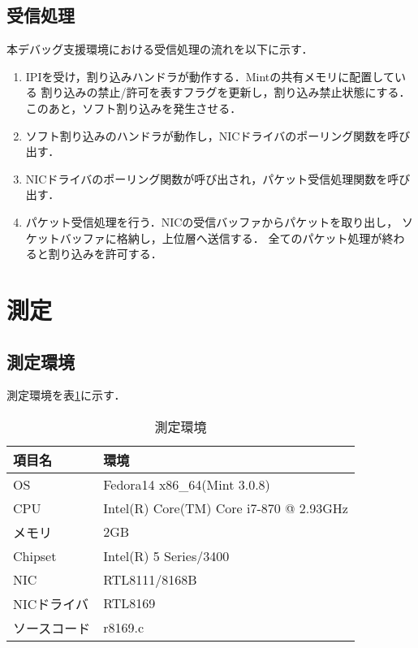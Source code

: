 \documentclass[12pt]{jsarticle}
\begin{document}
\subsection{受信処理}\label{rx}
本デバッグ支援環境における受信処理の流れを以下に示す．
\begin{enumerate}
    \item IPIを受け，割り込みハンドラが動作する．Mintの共有メモリに配置している
        割り込みの禁止/許可を表すフラグを更新し，割り込み禁止状態にする．
        このあと，ソフト割り込みを発生させる．
    \item ソフト割り込みのハンドラが動作し，NICドライバのポーリング関数を呼び出す．
    \item NICドライバのポーリング関数が呼び出され，パケット受信処理関数を呼び出す．
    \item パケット受信処理を行う．NICの受信バッファからパケットを取り出し，
        ソケットバッファに格納し，上位層へ送信する．
        全てのパケット処理が終わると割り込みを許可する．
\end{enumerate}

\section{測定}
\subsection{測定環境}
測定環境を表\ref{environment}に示す．

\begin{table}[h]
    \caption{測定環境}
    \label{environment}
    \begin{center}
        \begin{tabular}{l|l}   \hline \hline 
            項目名      & 環境                                    \\ \hline
            OS          & Fedora14 x86\_64(Mint 3.0.8)            \\ 
            CPU         & Intel(R) Core(TM) Core i7-870 @ 2.93GHz \\
            メモリ      & 2GB                                     \\
            Chipset     & Intel(R) 5 Series/3400                  \\
            NIC         & RTL8111/8168B                           \\
            NICドライバ & RTL8169                                 \\ 
            ソースコード& r8169.c                                 \\ \hline
        \end{tabular}
    \end{center}
\end{table}
\end{document}
